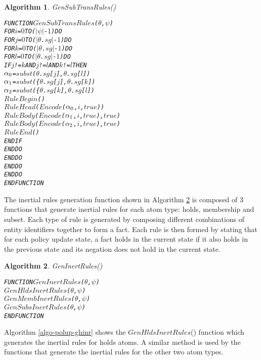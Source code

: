 \documentclass[11pt]{report}
\newenvironment{vverbatim}
{
  \begin{alltt}
}
{
    \vspace{-\baselineskip}
  \end{alltt}
}
\newtheorem{vvalgorithm}{Algorithm}[chapter]
\newenvironment{valgorithm}[2]
{
  \begin{vvalgorithm}{#1}
    \label{#2}
    \small
    \begin{vverbatim}
}
{
    \end{vverbatim}
  \end{vvalgorithm}
}
\begin{document}
          \begin{valgorithm}{GenSubTransRules()}{algo-polup-gstrr}
FUNCTION \(GenSubTransRules\)(\(\theta\), \(\psi\))
  FOR \(i\) = \(0\) TO (\(|\psi|\) - \(1\)) DO
    FOR \(j\) = \(0\) TO (\(|\)\(\theta\).\(sg\)\(|\) - \(1\)) DO
      FOR \(k\) = \(0\) TO (\(|\)\(\theta\).\(sg\)\(|\) - \(1\)) DO
        FOR \(l\) = \(0\) TO (\(|\)\(\theta\).\(sg\)\(|\) - \(1\)) DO
          IF \(j\) != \(k\) AND \(j\) != \(l\) AND \(k\) != \(l\) THEN
            \(\alpha\sb{0}\) = \(subst\)(\(\theta\).\(sg\)[\(j\)], \(\theta\).\(sg\)[\(l\)])
            \(\alpha\sb{1}\) = \(subst\)(\{\(\theta\).\(sg\)[\(j\)], \(\theta\).\(sg\)[\(k\)])
            \(\alpha\sb{2}\) = \(subst\)(\{\(\theta\).\(sg\)[\(k\)], \(\theta\).\(sg\)[\(l\)])
            \(RuleBegin\)()
            \(RuleHead\)(\(Encode\)(\(\alpha\sb{0}\), \(i\), \(true\)))
            \(RuleBody\)(\(Encode\)(\(\alpha\sb{1}\), \(i\), \(true\)), \(true\))
            \(RuleBody\)(\(Encode\)(\(\alpha\sb{2}\), \(i\), \(true\)), \(true\))
            \(RuleEnd\)()
          ENDIF
        ENDDO
      ENDDO
    ENDDO
  ENDDO
ENDFUNCTION
          \end{valgorithm}

          The inertial rules generation function shown in Algorithm
          \ref{algo-polup-giner} is composed of 3 functions that generate
          inertial rules for each atom type: holds, membership and
          subset. Each type of rule is generated by composing
          different combinations of entity identifiers together to form a fact.
          Each rule is then formed by stating that for each policy update
          state, a fact holds in the current state if it also holds in the
          previous state and its negation does not hold in the current state.

          \begin{valgorithm}{GenInertRules()}{algo-polup-giner}
FUNCTION \(GenInertRules\)(\(\theta\), \(\psi\))
  \(GenHldsInertRules\)(\(\theta\), \(\psi\))
  \(GenMembInertRules\)(\(\theta\), \(\psi\))
  \(GenSubsInertRules\)(\(\theta\), \(\psi\))
ENDFUNCTION
          \end{valgorithm}

          Algorithm \ref{algo-polup-ghinr} shows the $GenHldsInertRules$()
          function which generates the inertial rules for holds atoms. A
          similar method is used by the functions that generate the inertial
          rules for the other two atom types.
\end{document}
